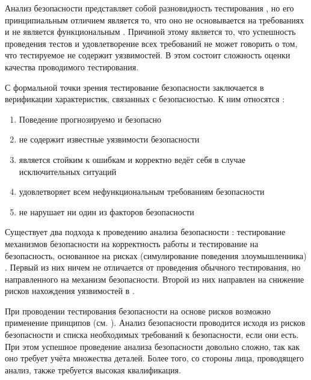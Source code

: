 %
Анализ безопасности  представляет собой разновидность тестирования , но его принципиальным отличием является то, что оно не основывается на требованиях и не является функциональным . 
%
Причиной этому является то, что успешность проведения тестов и удовлетворение всех требований не может говорить о том, что тестируемое  не содержит уязвимостей. 
%
В этом состоит сложность оценки качества проводимого тестирования. 

%
С формальной точки зрения тестирование безопасности  заключается в верификации характеристик, связанных с безопасностью. 
%
К ним относятся :
\begin{enumerate}
	\setlength{\itemsep}{0pt}%

	\item Поведение  прогнозируемо и безопасно
	
	\item {} не содержит известные уязвимости безопасности
	
	\item {} является стойким к ошибкам и корректно ведёт себя в случае исключительных ситуаций

	\item {} удовлетворяет всем нефункциональным требованиям безопасности

	\item {} не нарушает ни один из факторов безопасности
\end{enumerate}

%
Существует два подхода к проведению анализа безопасности : тестирование механизмов безопасности на корректность работы и тестирование  на безопасность, основанное на рисках (симулирование поведения злоумышленника) . 
%
Первый из них ничем не отличается от проведения обычного тестирования, но направленного на механизм безопасности. 
%
Второй из них направлен на снижение рисков нахождения уязвимостей в .

%
При проводении тестирования безопасности  на основе рисков возможно применение принципов \CIATriad (см. ). 
%
Анализ безопасности проводится исходя из рисков безопасности и списка необходимых требований к безопасности, если они есть. 
%
При этом успешное проведение анализа безопасности довольно сложно, так как оно требует учёта множества деталей. 
%
Более того, со стороны лица, проводящего анализ, также требуется высокая квалификация.

